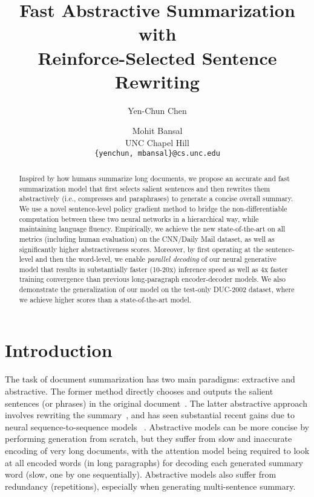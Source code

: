 \documentclass[11pt,a4paper]{article}
\title{Fast Abstractive Summarization with \\ Reinforce-Selected Sentence Rewriting}
\author{Yen-Chun Chen \and Mohit Bansal \\
  UNC Chapel Hill \\
  {\tt \{yenchun, mbansal\}@cs.unc.edu} \\
 }
\date{}
\begin{document}
\maketitle


\begin{abstract}
Inspired by how humans summarize long documents, we propose an accurate and fast summarization model that first selects salient sentences and then rewrites them abstractively (i.e., compresses and paraphrases) to generate a concise overall summary.
We use a novel sentence-level policy gradient method to bridge the non-differentiable computation between these two neural networks in a hierarchical way, while maintaining language fluency.
Empirically, we achieve the new state-of-the-art on all metrics (including human evaluation) on the CNN/Daily Mail dataset, as well as significantly higher abstractiveness scores.
Moreover, by first operating at the sentence-level and then the word-level, 
we enable \emph{parallel decoding} of our neural generative model that results in substantially faster (10-20x) inference speed as well as 4x faster training convergence than previous long-paragraph encoder-decoder models.
We also demonstrate the generalization of our model on the test-only DUC-2002 dataset, where we achieve higher scores than a state-of-the-art model.


\end{abstract}

\section{Introduction}
The task of document summarization has two main paradigms: extractive and abstractive. 
The former method directly chooses and outputs the salient sentences (or phrases) in the original document~\citep{Jing:2000:CPB:974305.974329,Knight:2000:SSS:647288.721086,Martins:2009:SJM:1611638.1611639,Berg-Kirkpatrick:2011:JLE:2002472.2002534}.
The latter abstractive approach involves rewriting the summary~\citep{Banko:2000:HGB:1075218.1075259,topiary}, and has seen substantial recent gains due to neural sequence-to-sequence models
~\citep{chopra-auli-rush:2016:N16-1,nallapati2016abstractive,get_to_the_point,DBLP:journals/corr/PaulusXS17}.
Abstractive models can be more concise by performing generation from scratch, but they suffer from slow and inaccurate encoding of very long documents, with the attention model being required to look at all encoded words (in long paragraphs) for decoding each generated summary word (slow, one by one sequentially). Abstractive models also suffer from redundancy (repetitions), especially when generating multi-sentence summary.
\end{document}
